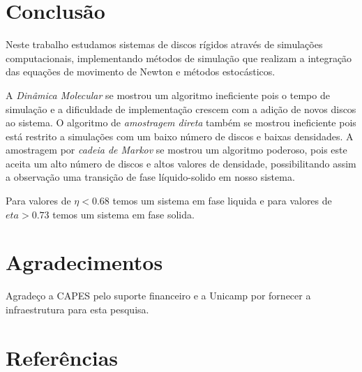 \documentclass[%
reprint,
amsmath,amssymb,
aps,
12pt
]{revtex4-1}
\begin{document}
\section{Conclusão}
Neste trabalho estudamos sistemas de discos rígidos através de simulações computacionais, implementando métodos de simulação que realizam a integração das equações de movimento de Newton e métodos estocásticos.

A \textit{Dinâmica Molecular} se mostrou um algoritmo ineficiente pois o tempo de simulação e a dificuldade de implementação crescem com a adição de novos discos ao sistema. 
O algoritmo de \textit{amostragem direta} também se mostrou ineficiente pois está restrito a simulações com um baixo número de discos e baixas densidades. A amostragem por \textit{cadeia de Markov} se mostrou um algoritmo poderoso, pois este aceita um alto número de discos e altos valores de densidade, possibilitando assim a observação uma transição de fase líquido-solido em nosso sistema. 

Para valores de $ \eta<0.68 $ temos um sistema em fase liquida e para valores de $ eta>0.73 $ temos um sistema em fase solida.


	
\section*{Agradecimentos}
		
Agradeço a CAPES pelo suporte financeiro e a Unicamp por fornecer a infraestrutura para esta pesquisa.

\section*{Referências}
\end{document}
